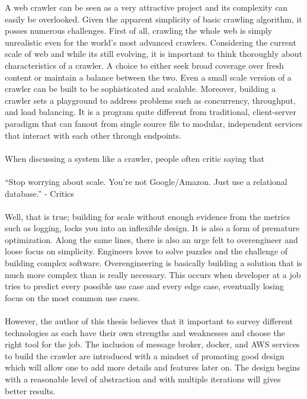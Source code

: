\pagebreak

\noindent
A web crawler can be seen as a very attractive project and its complexity can easily be overlooked.
Given the apparent simplicity of basic crawling algorithm, it posses numerous challenges. First of all,
crawling the whole web is simply unrealistic even for the world's most advanced crawlers. Considering the
current scale of web and while its still evolving, it is important to think thoroughly about
characteristics of a crawler. A choice to either seek broad coverage over fresh content or maintain a balance between the two. Even a small scale version of a crawler can be built to
be sophisticated and scalable. Moreover, building a crawler sets a playground to address problems such
as concurrency, throughput, and load balancing. It is a program quite different from traditional,
client-server paradigm that can fanout from single source file to modular, independent services that interact with each other through endpoints. 
\\
\\
When discussing a system like a crawler, people often critic saying that
\\
\\
``Stop worrying about scale. You're not Google/Amazon. Just use a relational database.'' - Critics
\\
\\
Well, that is true; building for scale without enough evidence from the metrics such as logging, locks you into an inflexible design. It is also a form
of premature optimization. Along the same lines, there is also an urge felt to overengineer and loose
focus on simplicity. Engineers loves to solve puzzles and the challenge of building complex software. Overengineering is basically building a solution that is much more complex than is really necessary. This occurs when developer at a job tries to predict every possible use case and every edge case, eventually losing focus on the most common use cases.  
\\
\\
However, the author of this thesis believes that it important to survey different technologies as each have
their own strengths and weaknesses and choose the right tool for the job. The inclusion of message broker, docker, and AWS services to build the crawler are introduced with a mindset of promoting good design which will allow one to add more details and features later on. The design begins with a reasonable level of abstraction and with multiple iterations will gives better results.


